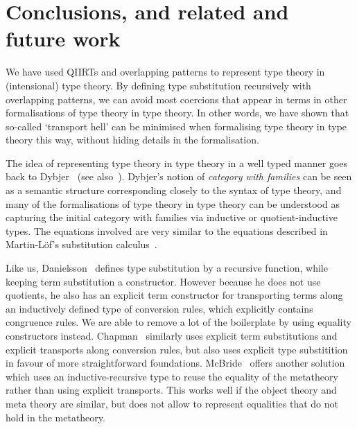 \documentclass[a4paper,UKenglish,numberwithinsect,cleveref,thm-restate]{lipics-v2021}
\newcommand{\LT}[2][]{\todo[inline,author={L-T},caption={},color={pink},#1]{#2}}
\begin{document}
\LT[noinline]{Mention the NbE for SC here?}

\section{Conclusions, and related and future work}\label{sec:conclusion}

We have used QIIRTs and overlapping
patterns to represent type theory in (intensional) type theory. By defining type
substitution recursively with overlapping patterns, we can avoid most
coercions that appear in terms in other formalisations of type
theory in type theory. In other words, we have shown that so-called
`transport hell' can be minimised when formalising type theory in type
theory this way, without hiding details in the formalisation.


The idea of representing type theory in type theory in a well typed manner goes back to Dybjer~\cite{Dybjer1996} (see also~\cite{Clairambault2014,Castellan2021}). Dybjer's notion of \emph{category with families} can be seen as a semantic structure corresponding closely to the syntax of type theory, and many of the formalisations of type theory in type theory can be understood as capturing the initial category with families via inductive or quotient-inductive types. The equations involved are very similar to the equations described in Martin-L\"of's substitution calculus~\cite{Martin-Lof1992}.

Like us, Danielsson~\cite{Danielsson2006} defines type substitution by a recursive function, while keeping term substitution a constructor. However because he does not use quotients, he also has an explicit term constructor for transporting terms along an inductively defined type of conversion rules, which explicitly contains congruence rules. We are able to remove a lot of the boilerplate by using equality constructors instead. Chapman~\cite{Chapman2009} similarly uses explicit term substitutions and explicit transports along conversion rules, but also uses explicit type substitition in favour of more straightforward foundations.
McBride~\cite{McBride2010} offers another solution which uses an inductive-recursive type to reuse the equality of the metatheory rather than using explicit transports. This works well if the object theory and meta theory are similar, but does not allow to represent equalities that do not hold in the metatheory.
\end{document}
